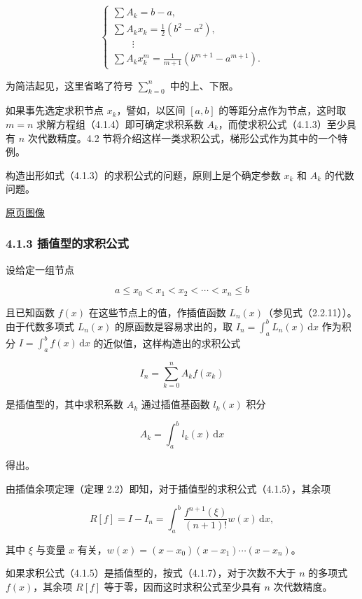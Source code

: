 \documentclass[
  10pt,
  fontset=fandol]{ctexart}
\begin{document}
\[
\begin{cases}
\displaystyle\sum A_k=b-a,\\[4pt]
\displaystyle\sum A_kx_k=\frac12(b^2-a^2),\\
\qquad\vdots\\
\displaystyle\sum A_kx_k^m=\frac{1}{m+1}(b^{m+1}-a^{m+1}).
\end{cases}
\tag{4.1.4}
\]

为简洁起见，这里省略了符号 \(\displaystyle\sum_{k=0}^n\) 中的上、下限。

如果事先选定求积节点 \(x_k\)，譬如，以区间 \([a,b]\) 的等距分点作为节点，这时取 \(m=n\) 求解方程组（4.1.4）即可确定求积系数 \(A_k\)，而使求积公式（4.1.3）至少具有 \(n\) 次代数精度。4.2 节将介绍这样一类求积公式，梯形公式作为其中的一个特例。

构造出形如式（4.1.3）的求积公式的问题，原则上是个确定参数 \(x_k\) 和 \(A_k\) 的代数问题。

\href{../../source-images/pdf-095.jpeg}{原页图像}

\subsubsection{4.1.3 插值型的求积公式}\label{ux63d2ux503cux578bux7684ux6c42ux79efux516cux5f0f}

设给定一组节点

\[
a\leq x_0<x_1<x_2<\cdots<x_n\leq b
\]

且已知函数 \(f(x)\) 在这些节点上的值，作插值函数 \(L_n(x)\)（参见式（2.2.11））。由于代数多项式 \(L_n(x)\) 的原函数是容易求出的，取 \(I_n=\int_a^b L_n(x)\,\mathrm{d}x\) 作为积分 \(I=\int_a^b f(x)\,\mathrm{d}x\) 的近似值，这样构造出的求积公式

\[
I_n=\sum_{k=0}^n A_kf(x_k)
\tag{4.1.5}
\]

是插值型的，其中求积系数 \(A_k\) 通过插值基函数 \(l_k(x)\) 积分

\[
A_k=\int_a^b l_k(x)\,\mathrm{d}x
\tag{4.1.6}
\]

得出。

由插值余项定理（定理 2.2）即知，对于插值型的求积公式（4.1.5），其余项

\[
R[f]=I-I_n=\int_a^b\frac{f^{n+1}(\xi)}{(n+1)!}w(x)\,\mathrm{d}x,
\tag{4.1.7}
\]

其中 \(\xi\) 与变量 \(x\) 有关，\(w(x)=(x-x_0)(x-x_1)\cdots(x-x_n)\)。

如果求积公式（4.1.5）是插值型的，按式（4.1.7），对于次数不大于 \(n\) 的多项式 \(f(x)\)，其余项 \(R[f]\) 等于零，因而这时求积公式至少具有 \(n\) 次代数精度。
\end{document}

